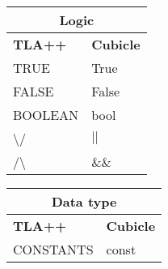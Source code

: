 \documentclass{article}
\begin{document}
\begin{tabular}{ |p{3cm}|p{3cm}|  }
 
 \hline
 \multicolumn{2}{|c|}{ \textbf{Logic}}  \\
 \hline

 \textbf{TLA++} & \textbf{ Cubicle}  \\
 \hline
  \hline
  TRUE &  True\\ 
 FALSE &  False\\ 
 BOOLEAN &  bool\\ 

 \textbackslash/ & $ || $ \\ 
  /\textbackslash & $\&\&$ \\ 
  \hline

\end{tabular}

\vspace{2 cm}

\begin{tabular}{ |p{3cm}|p{3cm}|  }
 
 \hline
 \multicolumn{2}{|c|}{ \textbf{Data type}}  \\
 \hline

 \textbf{TLA++} & \textbf{ Cubicle}  \\
 \hline
  \hline
  CONSTANTS &  const\\ 
  \hline

\end{tabular}




\end{document}
